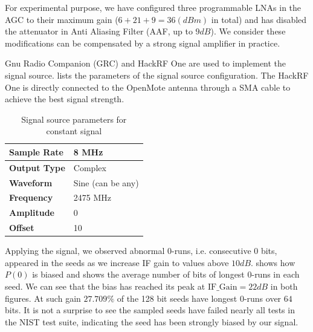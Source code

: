 For experimental purpose, we have configured three programmable LNAs in the AGC to their maximum gain ($6 + 21 + 9 = 36(dBm)$ in total) and has disabled the attenuator in Anti Aliasing Filter (AAF, up to $9dB$). We consider these modifications can be compensated by a strong signal amplifier in practice.

Gnu Radio Companion (GRC)\cite{GRC} and HackRF One\cite{HackRFOne} are used to implement the signal source.  lists the parameters of the signal source configuration. The HackRF One is directly connected to the OpenMote antenna through a SMA cable to achieve the best signal strength.

\begin{table}[!t]
\caption{Signal source parameters for constant signal}
\label{ConstantSignal}
\centering
\begin{tabular}{|l|l|}
\hline
\textbf{Sample Rate} & 8 MHz             \\ \hline
\textbf{Output Type} & Complex           \\ \hline
\textbf{Waveform}    & Sine (can be any) \\ \hline
\textbf{Frequency}   & 2475 MHz          \\ \hline
\textbf{Amplitude}   & 0                 \\ \hline
\textbf{Offset}      & 10                \\ \hline
\end{tabular}
\end{table}

Applying the signal, we observed abnormal 0-runs, i.e. consecutive $0$ bits, appeared in the seeds as we increase IF gain to values above $10dB$.  shows how $P(0)$ is biased and  shows the average number of bits of longest 0-runs in each seed. We can see that the bias has reached its peak at $\text{IF\_Gain} = 22dB$ in both figures. At such gain $27.709\%$ of the 128 bit seeds have longest 0-runs over $64$ bits. It is not a surprise to see the sampled seeds have failed nearly all tests in the NIST test suite, indicating the seed has been strongly biased by our signal. 

